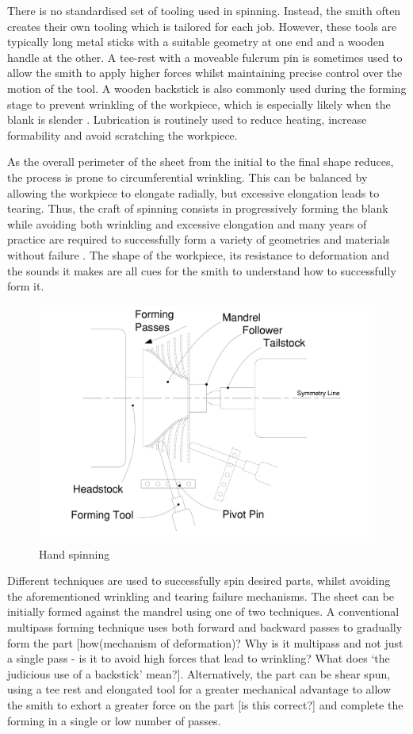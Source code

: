 There is no standardised set of tooling used in spinning. Instead, the smith often creates their own tooling which is tailored for each job. However, these tools are typically long metal sticks with a suitable geometry at one end and a wooden handle at the other. A tee-rest with a moveable fulcrum pin is sometimes used to allow the smith to apply higher forces whilst maintaining precise control over the motion of the tool. A wooden backstick is also commonly used during the forming stage to prevent wrinkling of the workpiece, which is especially likely when the blank is slender \citep{Jawale2019AnSpinning}. Lubrication is routinely used to reduce heating, increase formability and avoid scratching the workpiece.

As the overall perimeter of the sheet from the initial to the final shape reduces, the process is prone to circumferential wrinkling. This can be balanced by allowing the workpiece to elongate radially, but excessive elongation leads to tearing. Thus, the craft of spinning consists in progressively forming the blank while avoiding both wrinkling and excessive elongation and many years of practice are required to successfully form a variety of geometries and materials without failure \citep{Holtzappfel1852TurningManipulation,Tuells1912MetalUsed}. The shape of the workpiece, its resistance to deformation and the sounds it makes are all cues for the smith to understand how to successfully form it.

\begin{figure}[h]
    \centering
    \includegraphics[width=0.6\linewidth]{Images/Spinning.pdf}
    \caption{Hand spinning}
    \label{fig:SpinningTechDrawing}
\end{figure}


Different techniques are used to successfully spin desired parts, whilst avoiding the aforementioned wrinkling and tearing failure mechanisms. The sheet can be initially formed against the mandrel using one of two techniques. A conventional multipass forming technique uses both forward and backward passes to gradually form the part [how(mechanism of deformation)? Why is it multipass and not just a single pass - is it to avoid high forces that lead to wrinkling? What does ‘the judicious use of a backstick’ mean?]. Alternatively, the part can be shear spun, using a tee rest and elongated tool for a greater mechanical advantage to allow the smith to exhort a greater force on the part [is this correct?] and complete the forming in a single or low number of passes. 

